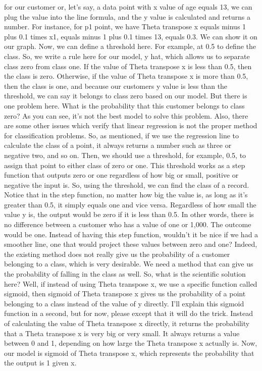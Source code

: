 for our customer or, let's say, a data point with x value of age equals 13, we can plug the value into the line formula, and the y value is calculated and returns a number. For instance, for p1 point, we have Theta transpose x equals minus 1 plus 0.1 times x1, equals minus 1 plus 0.1 times 13, equals 0.3. We can show it on our graph. Now, we can define a threshold here. For example, at 0.5 to define the class. So, we write a rule here for our model, y hat, which allows us to separate class zero from class one. If the value of Theta transpose x is less than 0.5, then the class is zero. Otherwise, if the value of Theta transpose x is more than 0.5, then the class is one, and because our customers y value is less than the threshold, we can say it belongs to class zero based on our model. But there is one problem here. What is the probability that this customer belongs to class zero? As you can see, it's not the best model to solve this problem. Also, there are some other issues which verify that linear regression is not the proper method for classification problems. So, as mentioned, if we use the regression line to calculate the class of a point, it always returns a number such as three or negative two, and so on. Then, we should use a threshold, for example, 0.5, to assign that point to either class of zero or one. This threshold works as a step function that outputs zero or one regardless of how big or small, positive or negative the input is. So, using the threshold, we can find the class of a record. Notice that in the step function, no matter how big the value is, as long as it's greater than 0.5, it simply equals one and vice versa. Regardless of how small the value y is, the output would be zero if it is less than 0.5. In other words, there is no difference between a customer who has a value of one or 1,000. The outcome would be one. Instead of having this step function, wouldn't it be nice if we had a smoother line, one that would project these values between zero and one? Indeed, the existing method does not really give us the probability of a customer belonging to a class, which is very desirable. We need a method that can give us the probability of falling in the class as well. So, what is the scientific solution here? Well, if instead of using Theta transpose x, we use a specific function called sigmoid, then sigmoid of Theta transpose x gives us the probability of a point belonging to a class instead of the value of y directly. I'll explain this sigmoid function in a second, but for now, please except that it will do the trick. Instead of calculating the value of Theta transpose x directly, it returns the probability that a Theta transpose x is very big or very small. It always returns a value between 0 and 1, depending on how large the Theta transpose x actually is. Now, our model is sigmoid of Theta transpose x, which represents the probability that the output is 1 given x. 
	

